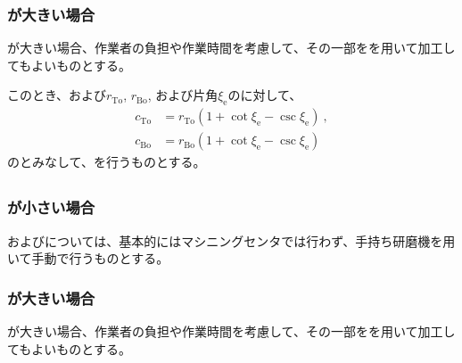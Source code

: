 \subsubsection{\EndFaceOutRChamferRadius が大きい場合}
\EndFaceOutRChamferRadius が大きい場合、作業者の負担や作業時間を考慮して、その一部を\TaperEndMill を用いて加工してもよいものとする。

このとき、\TopEndFaceOutRChamferRadius および\BottomEndFaceOutRChamferRadius$r_\mathrm{To}$, $r_\mathrm{Bo}$, および片角$\xi_\mathrm e$の\TaperEndMill に対して、
\begin{align*}
  c_\mathrm{To} &= r_\mathrm{To}\left(1+\cot\xi_\mathrm e-\csc\xi_\mathrm e\right)\ ,\\
  c_\mathrm{Bo} &= r_\mathrm{Bo}\left(1+\cot\xi_\mathrm e-\csc\xi_\mathrm e\right)
\end{align*}
の\EndFaceOutCChamferLength とみなして、\EndFaceInCChamferMilling を行うものとする。


\subsection{\EndFaceInRChamferMilling}

\subsubsection{\EndFaceInRChamferRadius が小さい場合}
\TopEndFaceInRChamferMilling および\BottomEndFaceInRChamferMilling については、基本的にはマシニングセンタでは行わず、手持ち研磨機を用いて手動で行うものとする。

\subsubsection{\EndFaceInRChamferRadius が大きい場合}
\EndFaceInRChamferRadius が大きい場合、作業者の負担や作業時間を考慮して、その一部を\TaperEndMill を用いて加工してもよいものとする。


